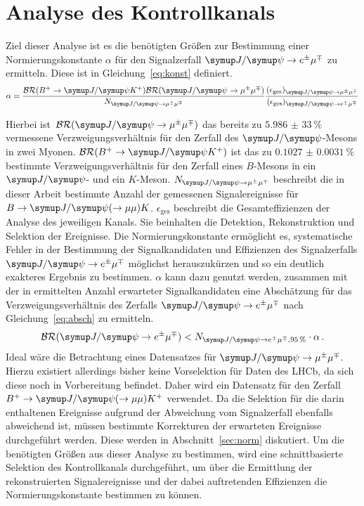 \chapter{Analyse des Kontrollkanals}
\label{chap:4}
%
Ziel dieser Analyse ist es die benötigten Größen zur Bestimmung einer Normierungskonstante $\alpha$ für den Signalzerfall $\signal$ zu ermitteln. Diese ist in Gleichung~\eqref{eq:konst} definiert.
%
\begin{equation}
  \alpha=\frac{\mathcal{BR}(B^{+}\rightarrow\jpsi K^{+})\mathcal{BR}(\kontroll)}{N_{\kontroll}}\frac{(\epsilon_{\text{ges}})_{\kontroll}}{(\epsilon_{\text{ges}})_{\signal}}
  \label{eq:konst}
\end{equation}
%

Hierbei ist~$\mathcal{BR}(\kontroll)$ das bereits zu $\SI{5,986(33)}{\percent}$ \cite{pdg} vermessene Verzweigungsverhältnis für den Zerfall des $\jpsi$-Mesons in zwei Myonen. $\mathcal{BR}(B^{+}\rightarrow\jpsi K^{+})$ ist das zu $\SI{0.1027(31)}{\percent}$ \cite{pdg} bestimmte Verzweigungsverhältnis für den Zerfall eines $B$-Mesons in ein $\jpsi$- und ein $K$-Meson. $N_{\kontroll}$ beschreibt die in dieser Arbeit bestimmte Anzahl der gemessenen Signalereignisse für $B\rightarrow\jpsi(\rightarrow\mu\mu) K$.
$\epsilon_{\text{ges}}$ beschreibt die Gesamteffizienzen der Analyse des jeweiligen Kanals. Sie beinhalten die Detektion,
Rekonstruktion und Selektion der Ereignisse. Die Normierungskonstante ermöglicht es, systematische Fehler in der Bestimmung der
Signalkandidaten und Effizienzen des Signalzerfalls $\signal$ möglichst herauszukürzen und so ein deutlich exakteres Ergebnis
zu bestimmen. $\alpha$ kann dazu genutzt werden, zusammen mit der in \cite{ba-maik} ermittelten Anzahl erwarteter
Signalkandidaten eine Abschätzung für das Verzweigungsverhältnis des Zerfalls $\signal$ nach Gleichung~\eqref{eq:absch} zu ermitteln.
%
\begin{equation}
  \mathcal{BR}(\signal)<N_{\signal, \SI{95}{\percent}}\cdot\alpha\, .
  \label{eq:absch}
\end{equation}
%
Ideal wäre die Betrachtung eines Datensatzes für $\kontroll$. Hierzu existiert allerdings bisher keine Vorselektion für Daten des LHCb, da sich diese noch in Vorbereitung befindet. Daher wird ein Datensatz für den Zerfall $B^{+}\rightarrow\jpsi(\rightarrow\mu\mu) K^{+}$ verwendet.
Da die Selektion für die darin enthaltenen Ereignisse aufgrund der Abweichung vom Signalzerfall ebenfalls abweichend ist, müssen bestimmte Korrekturen der erwarteten Ereignisse durchgeführt werden. Diese werden in Abschnitt~\ref{sec:norm} diskutiert.
Um die benötigten Größen aus dieser Analyse zu bestimmen, wird eine schnittbasierte Selektion des Kontrollkanals
durchgeführt, um über die Ermittlung der rekonstruierten Signalereignisse und der dabei auftretenden Effizienzen
die Normierungskonstante bestimmen zu können.
%
